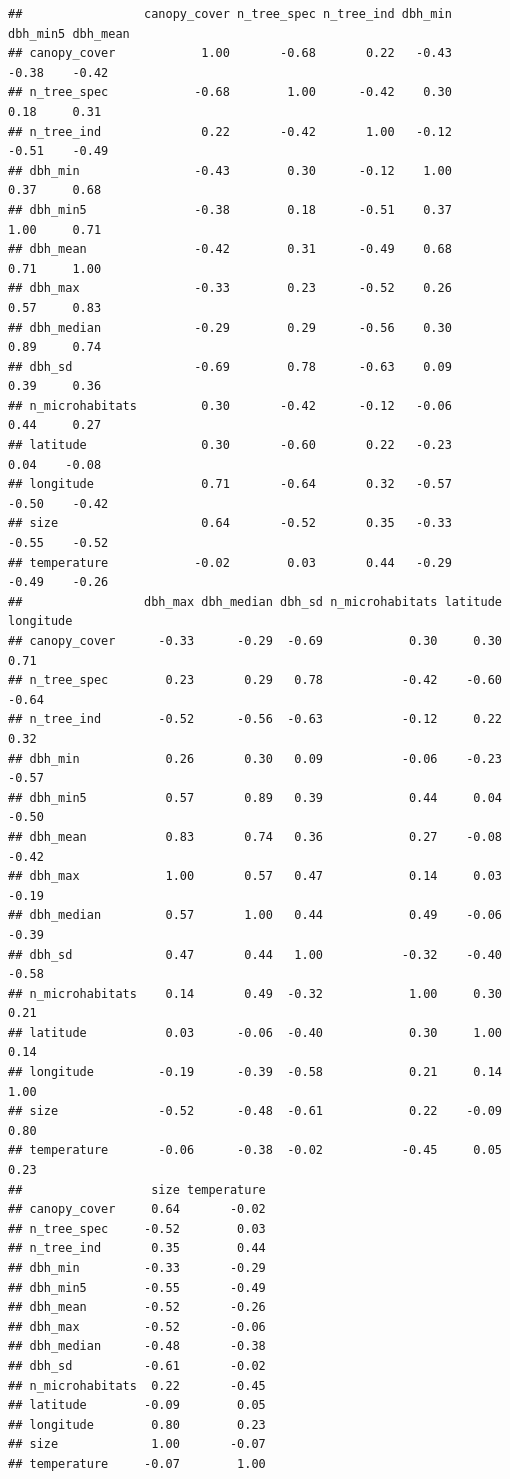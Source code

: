\documentclass[
]{article}
\begin{document}
\begin{verbatim}
##                 canopy_cover n_tree_spec n_tree_ind dbh_min dbh_min5 dbh_mean
## canopy_cover            1.00       -0.68       0.22   -0.43    -0.38    -0.42
## n_tree_spec            -0.68        1.00      -0.42    0.30     0.18     0.31
## n_tree_ind              0.22       -0.42       1.00   -0.12    -0.51    -0.49
## dbh_min                -0.43        0.30      -0.12    1.00     0.37     0.68
## dbh_min5               -0.38        0.18      -0.51    0.37     1.00     0.71
## dbh_mean               -0.42        0.31      -0.49    0.68     0.71     1.00
## dbh_max                -0.33        0.23      -0.52    0.26     0.57     0.83
## dbh_median             -0.29        0.29      -0.56    0.30     0.89     0.74
## dbh_sd                 -0.69        0.78      -0.63    0.09     0.39     0.36
## n_microhabitats         0.30       -0.42      -0.12   -0.06     0.44     0.27
## latitude                0.30       -0.60       0.22   -0.23     0.04    -0.08
## longitude               0.71       -0.64       0.32   -0.57    -0.50    -0.42
## size                    0.64       -0.52       0.35   -0.33    -0.55    -0.52
## temperature            -0.02        0.03       0.44   -0.29    -0.49    -0.26
##                 dbh_max dbh_median dbh_sd n_microhabitats latitude longitude
## canopy_cover      -0.33      -0.29  -0.69            0.30     0.30      0.71
## n_tree_spec        0.23       0.29   0.78           -0.42    -0.60     -0.64
## n_tree_ind        -0.52      -0.56  -0.63           -0.12     0.22      0.32
## dbh_min            0.26       0.30   0.09           -0.06    -0.23     -0.57
## dbh_min5           0.57       0.89   0.39            0.44     0.04     -0.50
## dbh_mean           0.83       0.74   0.36            0.27    -0.08     -0.42
## dbh_max            1.00       0.57   0.47            0.14     0.03     -0.19
## dbh_median         0.57       1.00   0.44            0.49    -0.06     -0.39
## dbh_sd             0.47       0.44   1.00           -0.32    -0.40     -0.58
## n_microhabitats    0.14       0.49  -0.32            1.00     0.30      0.21
## latitude           0.03      -0.06  -0.40            0.30     1.00      0.14
## longitude         -0.19      -0.39  -0.58            0.21     0.14      1.00
## size              -0.52      -0.48  -0.61            0.22    -0.09      0.80
## temperature       -0.06      -0.38  -0.02           -0.45     0.05      0.23
##                  size temperature
## canopy_cover     0.64       -0.02
## n_tree_spec     -0.52        0.03
## n_tree_ind       0.35        0.44
## dbh_min         -0.33       -0.29
## dbh_min5        -0.55       -0.49
## dbh_mean        -0.52       -0.26
## dbh_max         -0.52       -0.06
## dbh_median      -0.48       -0.38
## dbh_sd          -0.61       -0.02
## n_microhabitats  0.22       -0.45
## latitude        -0.09        0.05
## longitude        0.80        0.23
## size             1.00       -0.07
## temperature     -0.07        1.00
\end{verbatim}
\end{document}
